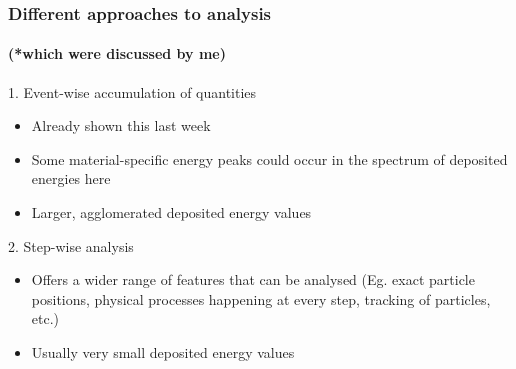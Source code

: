 \begin{frame}
\frametitle{Different approaches to analysis}
\framesubtitle{(*which were discussed by me)}

\begin{block}{1. Event-wise accumulation of quantities}
	\begin{itemize}
		\item Already shown this last week
		\item Some material-specific energy peaks could occur in the spectrum of deposited energies here
		\item Larger, agglomerated deposited energy values
	\end{itemize}
\end{block}

\begin{block}{2. Step-wise analysis}
	\begin{itemize}
		\item Offers a wider range of features that can be analysed (Eg. exact particle positions, physical processes happening at every step, tracking of particles, etc.)
		\item Usually very small deposited energy values
	\end{itemize}
\end{block}

\end{frame}